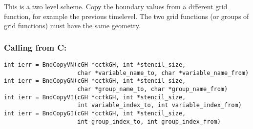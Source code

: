 \documentclass{article}
\begin{document}
This is a two level scheme. Copy the boundary values from a different
grid function, for example the previous timelevel. The two grid functions
(or groups of grid functions) must have the same geometry.

\subsubsection*{Calling from C:}
\begin{verbatim}
int ierr = BndCopyVN(cGH *cctkGH, int *stencil_size, 
                     char *variable_name_to, char *variable_name_from)
int ierr = BndCopyGN(cGH *cctkGH, int *stencil_size, 
                     char *group_name_to, char *group_name_from)
int ierr = BndCopyVI(cGH *cctkGH, int *stencil_size, 
                     int variable_index_to, int variable_index_from)
int ierr = BndCopyGI(cGH *cctkGH, int *stencil_size, 
                     int group_index_to, int group_index_from)
\end{verbatim}
\end{document}
